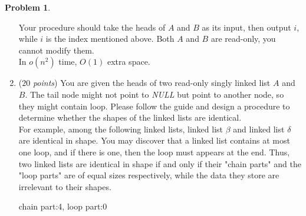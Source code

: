 \documentclass[12pt,a4paper]{report}
\newcommand{\points}[1]{ ($#1$ \textit{points}) }
\theoremstyle{definition}
\newtheorem{problem}{\textbf{Problem}}
\theoremstyle{definition}
\begin{document}
\begin{problem}
\begin{enumerate}[label=\arabic*.]
        Your procedure should take the heads of $A$ and $B$ as its input, then output $i$, while $i$ is the index mentioned above.
        Both $A$ and $B$ are read-only, you cannot modify them.\\
        In $o(n^2)$ time, $O(1)$ extra space.

\item \points{20}You are given the heads of two read-only singly linked list $A$ and $B$. The tail node might not point to \textit{NULL} but point to another node, so they might contain loop. Please follow the guide and design a procedure to determine whether the shapes of the linked lists are identical.\\
        For example, among the following linked lists, linked list $\beta$ and linked list $\delta$ are identical in shape. You may discover that a linked list contains at most one loop, and if there is one, then the loop must appears at the end. Thus, two linked lists are identical in shape if and only if their "chain parts" and the "loop parts" are of equal sizes respectively, while the data they store are irrelevant to their shapes.\\

        chain part:4, loop part:0\\


\end{enumerate}
\end{problem}
\end{document}
